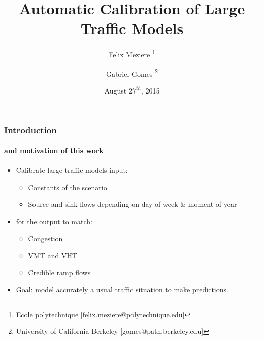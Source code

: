 \documentclass[fleqn]{beamer}
\begin{document}
\title{Automatic Calibration of Large Traffic Models}
\date{August $27^{th}$, 2015}
\author[Meziere, Gomes]{Felix Meziere \thanks{Ecole polytechnique [felix.meziere@polytechnique.edu]} \and Gabriel Gomes \thanks{University of California Berkeley [gomes@path.berkeley.edu]}}
\maketitle
 
\begin{frame}
\frametitle{Introduction}
\framesubtitle{and motivation of this work}
\begin{itemize}
	\item Calibrate large traffic models input:
	\begin{itemize}
		\item Constants of the scenario
		\item Source and sink flows depending on day of week \& moment of year
	\end{itemize}	
	\item for the output to match:
	\begin{itemize}
		\item Congestion
		\item VMT and VHT
		\item Credible ramp flows
	\end{itemize}
	\item Goal: model accurately a usual traffic situation to make predictions.
\end{itemize}
\end{frame}
\end{document}
